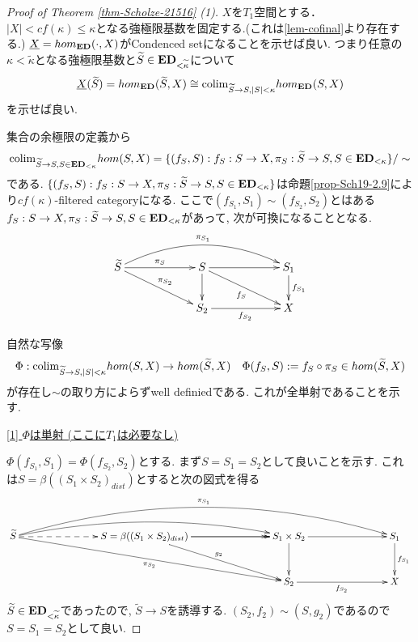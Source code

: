 \documentclass[dvipdfmx,a4paper,11pt]{report}
\newcommand{\colim}{{\rm colim}}
\theoremstyle{definition}
\begin{document}
\begin{proof}[Proof of Theorem \ref{thm-Scholze-21516} (1)]
$X$を$T_1$空間とする． 
$|X| < cf(\kappa) \le \kappa$となる強極限基数を固定する.(これは\ref{lem-cofinal}より存在する.)
$\underline{X} = hom_{{\bf ED}}(\cdot, X)$がCondenced setになることを示せば良い.
つまり任意の$\kappa<\widetilde{\kappa}$となる強極限基数と$\widetilde{S} \in {\bf ED}_{< \widetilde{\kappa}}$について
$$
\underline{X}(\widetilde{S})=hom_{{\bf ED}}(\widetilde{S}, X)
\cong
\colim_{\widetilde{S} \to S, |S|<\kappa}hom_{{\bf ED}}(S,X)
$$
を示せば良い.

集合の余極限の定義から
$$
\colim_{\widetilde{S} \to S, S \in {\bf ED}_{<\kappa}}hom(S,X)
=
\{ (f_{S}, S) : f_S : S \to X, \pi_{S}: \widetilde{S} \to S, S \in {\bf ED}_{<\kappa}\}/\sim
$$
である.
$\{ (f_{S}, S) : f_S : S \to X, \pi_{S}: \widetilde{S} \to S, S \in {\bf ED}_{<\kappa}\}
$は命題\ref{prop-Sch19-2.9}により$cf(\kappa)$-filtered categoryになる. 
ここで$(f_{S_1}, S_1) \sim (f_{S_2}, S_2)$とはある$f_S : S \to X, \pi_{S}: \widetilde{S} \to S, S \in {\bf ED}_{<\kappa}$があって, 次が可換になることとなる.
\begin{equation*}
\xymatrix@C=60pt@R=20pt{
\widetilde{S}\ar@{->}[r]^{\pi_S} \ar@/^20pt/[rr]^{\pi_{S_{1}}}\ar@{->}[rd]^{\pi_{S_2}}
&S\ar@{->}[d]  \ar@{->}[r] \ar@{->}[rd]_{f_S}
& S_1\ar@{->}[d]^{f_{S_1}}
\\
&S_2 \ar@{->}[r]_{f_{S_2}} 
&X
 \\   
}
\end{equation*}

自然な写像
\begin{equation}
\Phi : \colim_{\widetilde{S} \to S, |S|<\kappa}hom(S,X)
\to hom(\widetilde{S}, X)
\quad
\Phi(f_{S}, S):=  f_S \circ \pi_S \in hom(\widetilde{S}, X)
\end{equation}
が存在し$\sim$の取り方によらずwell definiedである.
これが全単射であることを示す.

\underline{[1] $\Phi$は単射 (ここに$T_1$は必要なし) }

$\Phi(f_{S_1}, S_1) = \Phi(f_{S_2}, S_2)$とする.
まず$S=S_1=S_2$として良いことを示す. 
これは$S = \beta((S_1 \times S_2)_{dist})$とすると次の図式を得る
\begin{equation*}
\xymatrix@C=80pt@R=30pt{
\widetilde{S}\ar@{-->}[r] \ar@/^30pt/[rrr]^{\pi_{S_{1}}}
\ar@/^15pt/[rr]\ar@{->}[rrd]_{\pi_{S_2}}
& S=\beta((S_1 \times S_2)_{dist})
\ar@{->}[r] \ar@{->>}[r]\ar@{->}[rd]^{g_2}
&S_1 \times S_2\ar@{->}[d]  \ar@{->}[r] 
& S_1\ar@{->}[d]^{f_{S_1}}
\\
&
&S_2 \ar@{->}[r]_{f_{S_2}} 
&X
 \\   
}
\end{equation*} 
$\widetilde{S} \in {\bf ED}_{< \widetilde{\kappa}}$であったので, 
$\widetilde{S} \to S$を誘導する.
$(S_2,f_2) \sim (S, g_2)$であるので$S=S_1=S_2$として良い.


\end{proof}
\end{document}
